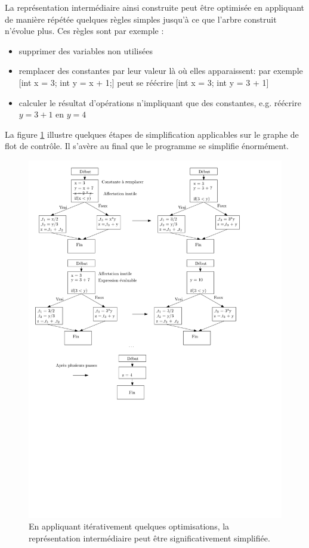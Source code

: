 La représentation intermédiaire ainsi construite peut être optimisée en appliquant de manière répétée quelques règles simples jusqu'à ce que l'arbre construit n'évolue plus. Ces règles sont par exemple :
\begin{itemize}
\item supprimer des variables non utilisées
\item remplacer des constantes par leur valeur là o{\`u} elles apparaissent: par exemple [int x = 3; int y = x + 1;] peut se réécrire [int x = 3; int y = 3 + 1]
\item calculer le résultat d'opérations n'impliquant que des constantes, e.g. réécrire $y=3+1$ en $y=4$
\end{itemize}

La figure \ref{fig:control_flow_graph_optim} illustre quelques étapes de simplification applicables sur le graphe de flot de contrôle. Il s'avère au final que le programme se simplifie énormément.

\begin{figure}[htbp]
\centering\includegraphics[width=\columnwidth]{Figs/three_adresses_optimisation.pdf}
\caption{\label{fig:control_flow_graph_optim} En appliquant itérativement quelques optimisations, la représentation intermédiaire peut être significativement simplifiée.}
\end{figure}




